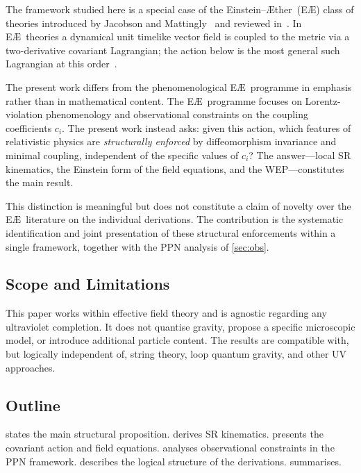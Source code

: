 \documentclass[12pt,a4paper]{article}
\newcommand{\Aether}{\AE ther}
\begin{document}
The framework studied here is a special case of the Einstein--\Aether\ (E\AE)
class of theories introduced by Jacobson and Mattingly~\citep{jacobson2001}
and reviewed in~\citep{jacobson2008}. In E\AE\ theories a dynamical unit
timelike vector field is coupled to the metric via a two-derivative covariant
Lagrangian; the action below is the most general such Lagrangian at this
order~\citep{jacobson2001}.

The present work differs from the phenomenological E\AE\ programme in
emphasis rather than in mathematical content. The E\AE\ programme focuses on
Lorentz-violation phenomenology and observational constraints on the coupling
coefficients $c_i$. The present work instead asks: given this action, which
features of relativistic physics are \emph{structurally enforced} by
diffeomorphism invariance and minimal coupling, independent of the specific
values of $c_i$? The answer---local SR kinematics, the Einstein form of the
field equations, and the WEP---constitutes the main result.

This distinction is meaningful but does not constitute a claim of novelty over
the E\AE\ literature on the individual derivations. The contribution is the
systematic identification and joint presentation of these structural
enforcements within a single framework, together with the PPN analysis of
\cref{sec:obs}.

\subsection{Scope and Limitations}

This paper works within effective field theory and is agnostic regarding any
ultraviolet completion. It does not quantise gravity, propose a specific
microscopic model, or introduce additional particle content. The results are
compatible with, but logically independent of, string theory, loop quantum
gravity, and other UV approaches.

\subsection{Outline}

 states the main structural proposition.
 derives SR kinematics.
 presents the covariant action and field equations.
 analyses observational constraints in the PPN framework.
 describes the logical structure of the derivations.
 summarises.
\end{document}

